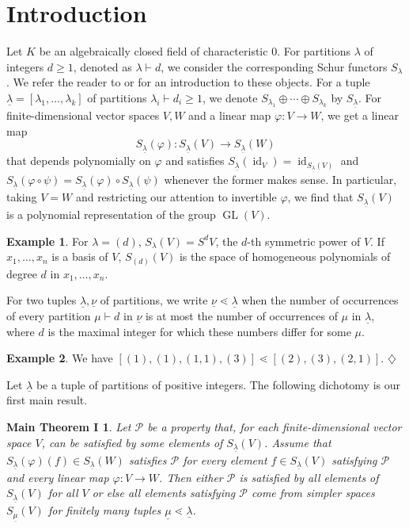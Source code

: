 \documentclass{amsart}
\theoremstyle{plain}
\newtheorem*{main1}{Main Theorem I}
\theoremstyle{definition}
\newtheorem*{ex*}{Example}
\DeclareMathOperator{\id}{id}
\renewcommand{\phi}{\varphi}
\DeclareMathOperator{\GL}{GL}
\begin{document}
\section{Introduction}

Let $K$ be an algebraically closed field of characteristic
$0$. For partitions $\lambda$ of integers $d\geq 1$, denoted
as $\lambda\vdash d$, we consider the corresponding Schur 
functors $S_{\lambda}$. We refer the reader to
\cite{G:polyreps} or \cite[Lecture~6]{FH:first_course} for
an introduction to these objects. For a tuple
$\underline{\lambda}=[\lambda_1,\ldots,\lambda_k]$ of
partitions $\lambda_i\vdash d_i\geq 1$, we denote
$S_{\lambda_1}\oplus\cdots\oplus S_{\lambda_k}$ by
$S_{\underline{\lambda}}$. For finite-dimensional vector
spaces $V,W$ and a linear map $\phi:V \to W$, we get 
a linear map
\[
S_{\underline{\lambda}}(\phi)\colon S_{\underline{\lambda}}(V)\to S_{\underline{\lambda}}(W)
\]
that depends polynomially on $\phi$ and satisfies 
$S_{\underline{\lambda}}(\id_V)=\id_{S_{\underline{\lambda}}(V)}$ and $S_{\underline{\lambda}}(\phi\circ\psi)=S_{\underline{\lambda}}(\phi)\circ S_{\underline{\lambda}}(\psi)$ whenever the former makes sense. In particular, taking
$V=W$ and restricting our attention to invertible $\phi$, we
find that $S_{\underline{\lambda}}(V)$ is
a polynomial representation of the group $\GL(V)$. 

\begin{ex*}
For $\lambda=(d)$, $S_\lambda(V)=S^d V$, the
$d$-th symmetric power of $V$. If $x_1,\ldots,x_n$ is a
basis of $V$, $S_{(d)}(V)$ is the space of homogeneous
polynomials of degree $d$ in $x_1,\ldots,x_n$.
\end{ex*}

For two tuples $\underline{\lambda},\underline{\nu}$ of partitions, we
write $\underline{\nu}\lessdot\underline{\lambda}$ when the number of
occurrences of every partition $\mu\vdash d$ in $\underline{\nu}$ is at
most the number of occurrences of $\mu$ in $\underline{\lambda}$, where
$d$ is the maximal integer for which these numbers differ for some $\mu$.

\begin{ex*}
We have $[(1),(1),(1,1),(3)] \lessdot [(2),(3),(2,1)]$. 
\hfill$\diamondsuit$
\end{ex*}

Let $\underline{\lambda}$ be a tuple of partitions of
positive integers. The following dichotomy is our first main result.

\begin{main1}
Let $\mathcal{P}$ be a property that, for each
finite-dimensional vector space $V$, can be satisfied by some elements of $S_{\underline{\lambda}}(V)$. Assume that $S_{\underline{\lambda}}(\phi)(f)\in S_{\underline{\lambda}}(W)$ satisfies $\mathcal{P}$ for every element $f\in  S_{\underline{\lambda}}(V)$ satisfying $\mathcal{P}$ and every linear map $\phi\colon V\to W$. Then either $\mathcal{P}$ is satisfied by all elements of $S_{\underline{\lambda}}(V)$ for all $V$ or else all elements satisfying $\mathcal{P}$ come from simpler spaces $S_{\underline{\mu}}(V)$ for finitely many tuples $\underline{\mu}\lessdot\underline{\lambda}$.
\end{main1}
\end{document}
